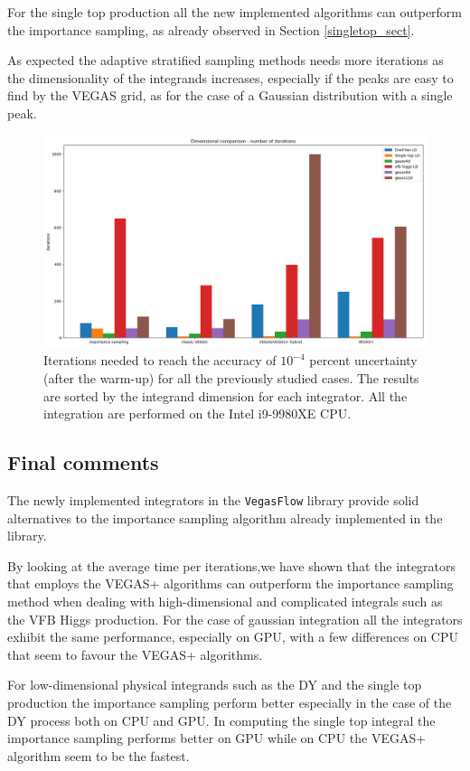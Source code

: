 \documentclass[../main/main.tex]{subfiles}
\begin{document}
For the single top production all the new implemented algorithms can outperform the importance sampling, as already observed in Section \ref{singletop_sect}.

As expected the adaptive stratified sampling methods needs more iterations as the dimensionality of the integrands increases, especially if the peaks are easy to find by the VEGAS grid, as for the case of a Gaussian distribution with a single peak.
\begin{figure}[h]
	\centering
	\includegraphics[width=\textwidth]{../images/dim_comparison_iter.png}
	\caption{Iterations needed to reach the accuracy of $10^{-4}$ percent uncertainty (after the warm-up) for all the previously studied cases. The results are sorted by the integrand dimension for each integrator. All the integration are performed on the Intel i9-9980XE CPU. }
	\label{cpu_iter_comparison}
\end{figure}

\subsection{Final comments}
The newly implemented integrators in the \texttt{VegasFlow} library provide solid alternatives to the importance sampling algorithm already implemented in the library.

By looking at the average time per iterations,we have shown that the integrators that employs the VEGAS+ algorithms can outperform the importance sampling method when dealing with high-dimensional and complicated integrals such as the VFB Higgs production.
For the case of gaussian integration all the integrators exhibit the same performance, especially on GPU, with a few differences on CPU that seem to favour the VEGAS+ algorithms.

For low-dimensional physical integrands such as the DY and the single top production the importance sampling perform better especially in the case of the DY process both on CPU and GPU.
In computing the single top integral the importance sampling  performs better on GPU while on CPU the VEGAS+ algorithm seem to be the fastest.
\end{document}
